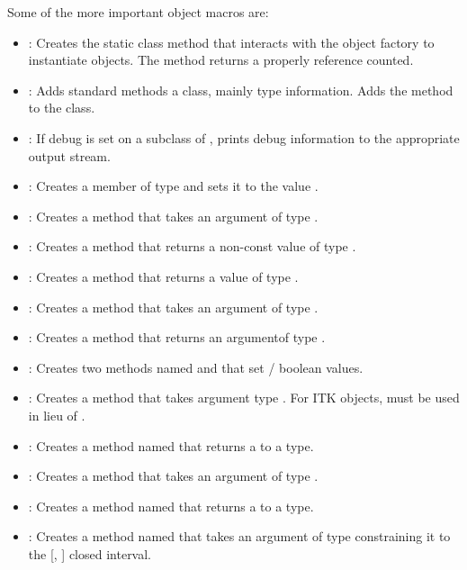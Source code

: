 Some of the more important object macros are:
\begin{itemize}
\item {}: Creates the static class method 
that interacts with the object factory to instantiate objects. The method
returns a  properly reference counted.
\item {}: Adds standard methods a
class, mainly type information. Adds the  method to the
class.
\item {}: If debug is set on a subclass of
, prints debug information to the appropriate output
stream.
\item {}: Creates a
 member of type  and sets it to the value
.
\item {}: Creates a method  that
takes an argument of type .
\item {}: Creates a method  that
returns a non-const value of type .
\item {}: Creates a method 
that returns a  value of type .
\item {}: Creates a method  that
takes an argument of type .
\item {}: Creates a method  that
returns an argumentof  type .
\item {}: Creates two methods named  and
 that set / boolean values.
\item {}: Creates a method 
that takes argument type . For ITK objects,
 must be used in lieu of .
\item {}: Creates a method named
 that returns a  to a  type.
\item {}: Creates a method
 that takes an argument of type .
\item {}: Creates a method named
 that returns a   to a
 type.
\item {}: Creates a method named
 that takes an argument of type  constraining it
to the [, ] closed interval.
\end{itemize}

